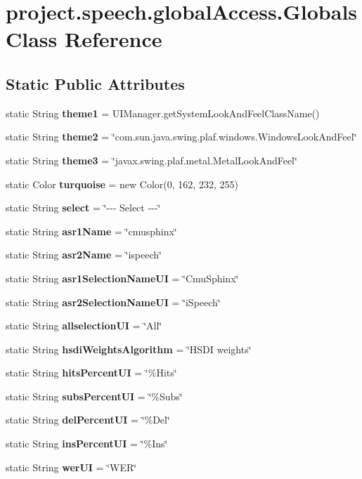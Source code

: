 \section{project.\+speech.\+global\+Access.\+Globals Class Reference}
\label{classproject_1_1speech_1_1global_access_1_1_globals}
\subsection*{Static Public Attributes}
\begin{DoxyCompactItemize}
\item 
static String {\bf theme1} = U\+I\+Manager.\+get\+System\+Look\+And\+Feel\+Class\+Name()
\item 
static String {\bf theme2} = \char`\"{}com.\+sun.\+java.\+swing.\+plaf.\+windows.\+Windows\+Look\+And\+Feel\char`\"{}
\item 
static String {\bf theme3} = \char`\"{}javax.\+swing.\+plaf.\+metal.\+Metal\+Look\+And\+Feel\char`\"{}
\item 
static Color {\bf turquoise} = new Color(0, 162, 232, 255)
\item 
static String {\bf select} = \char`\"{}-\/-\/-\/ Select -\/-\/-\/\char`\"{}
\item 
static String {\bf asr1\+Name} = \char`\"{}cmusphinx\char`\"{}
\item 
static String {\bf asr2\+Name} = \char`\"{}ispeech\char`\"{}
\item 
static String {\bf asr1\+Selection\+Name\+U\+I} = \char`\"{}Cmu\+Sphinx\char`\"{}
\item 
static String {\bf asr2\+Selection\+Name\+U\+I} = \char`\"{}i\+Speech\char`\"{}
\item 
static String {\bf allselection\+U\+I} = \char`\"{}All\char`\"{}
\item 
static String {\bf hsdi\+Weights\+Algorithm} = \char`\"{}H\+S\+D\+I weights\char`\"{}
\item 
static String {\bf hits\+Percent\+U\+I} = \char`\"{}\%Hits\char`\"{}
\item 
static String {\bf subs\+Percent\+U\+I} = \char`\"{}\%Subs\char`\"{}
\item 
static String {\bf del\+Percent\+U\+I} = \char`\"{}\%Del\char`\"{}
\item 
static String {\bf ins\+Percent\+U\+I} = \char`\"{}\%Ins\char`\"{}
\item 
static String {\bf wer\+U\+I} = \char`\"{}W\+E\+R\char`\"{}

\end{DoxyCompactItemize}
